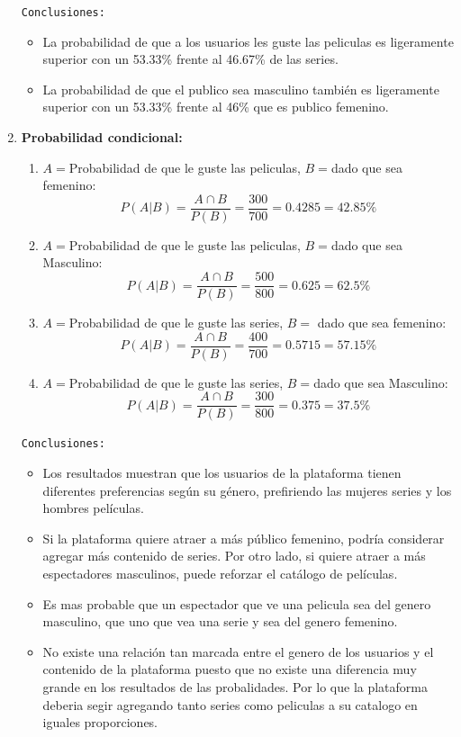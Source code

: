 \documentclass[12pt]{article}
\begin{document}
\begin{enumerate}
                \texttt{Conclusiones:} 
                \begin{itemize}
                    \item La probabilidad de que a los usuarios les guste las peliculas es ligeramente superior
                        con un 53.33\% frente al 46.67\% de las series.
                    \item La probabilidad de que el publico sea masculino también es ligeramente superior con
                        un 53.33\% frente al 46\% que es publico femenino.
                \end{itemize}

            \item \textbf{Probabilidad condicional:}
                \begin{enumerate}
                    \item $A = $Probabilidad de que le guste las peliculas, $B = $dado que sea femenino:
                        \[P(A \vert B) = \frac{A \cap B}{P(B)} = \frac{300}{700} = 0.4285 = 42.85\%\]
                    \item $A = $Probabilidad de que le guste las peliculas, $B = $dado que sea Masculino:
                        \[P(A \vert B) = \frac{A \cap B}{P(B)} = \frac{500}{800} = 0.625 = 62.5\%\]
                    \item $A = $Probabilidad de que le guste las series, $B = $ dado que sea femenino:
                        \[P(A \vert B) = \frac{A \cap B}{P(B)} = \frac{400}{700} = 0.5715 = 57.15 \%\]
                    \item $A = $Probabilidad de que le guste las series, $B = $dado que sea Masculino: 
                        \[P(A \vert B) = \frac{A \cap B}{P(B)} = \frac{300}{800} = 0.375 = 37.5\%\]
                \end{enumerate}
                \texttt{Conclusiones:} 
                \begin{itemize}
                    \item Los resultados muestran que los usuarios de la plataforma tienen diferentes preferencias según su género, prefiriendo las mujeres series y los hombres películas.
                    \item Si la plataforma quiere atraer a más público femenino, podría considerar agregar más contenido de series. Por otro lado, si quiere atraer a más espectadores masculinos, puede reforzar el catálogo de películas.
                    \item Es mas probable que un espectador que ve una pelicula sea del genero masculino, que uno que vea una serie y sea del genero femenino.
                    \item No existe una relación tan marcada entre el genero de los usuarios y el contenido de la plataforma puesto que
                        no existe una diferencia muy grande en los resultados de las probalidades. Por lo que la plataforma deberia
                        segir agregando tanto series como peliculas a su catalogo en iguales proporciones.
                \end{itemize}
                
        \end{enumerate}
\end{document}
